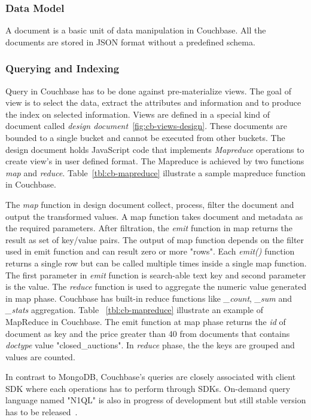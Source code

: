 \subsubsection{Data Model}%
A document is a basic unit of data manipulation in Couchbase. All the documents are stored in JSON format without a predefined schema.

\subsubsection{Querying and Indexing}
Query in Couchbase has to be done against pre-materialize views. The goal of view is to select the data, extract the attributes and information and to produce the index on selected information. Views are defined in a special kind of document called \textit{design document}~\ref{fig:cb-views-design}. These documents are bounded to a single bucket and cannot be executed from other buckets. The design document holds JavaScript code that implements \textit{Mapreduce} operations to create view's in user defined format. The Mapreduce is achieved by two functions \textit{map} and \textit{reduce}. Table~\ref{tbl:cb-mapreduce} illustrate a sample mapreduce function in Couchbase.

The \textit{map} function in design document collect, process, filter the document and output the transformed values. A map function takes document and metadata as the required parameters. After filtration, the \textit{emit} function in map returns the result as set of key/value pairs. The output of map function depends on the filter used in emit function and can result zero or more "rows". Each \textit{emit()} function returns a single row but can be called multiple times inside a single map function. The first parameter in \textit{emit} function is search-able text key and second parameter is the value.
The \textit{reduce} function is used to aggregate the numeric value generated in map phase. Couchbase has built-in reduce functions like \textit{\_count}, \textit{\_sum} and \textit{\_stats} aggregation. Table ~\ref{tbl:cb-mapreduce} illustrate an example of MapReduce  in Couchbase. The emit function at map phase returns the \textit{id} of document  as key and the price greater than 40 from documents that contains \textit{doctype} value "closed\_auctions". In \textit{reduce} phase, the the keys are grouped and values are counted.

 In contrast to MongoDB,  Couchbase's queries are closely associated with client SDK where each operations has to perform through SDKs. On-demand query language  named "N1QL" is also in  progress of development but still stable version has to be released~\cite{couchbasen1ql}.


